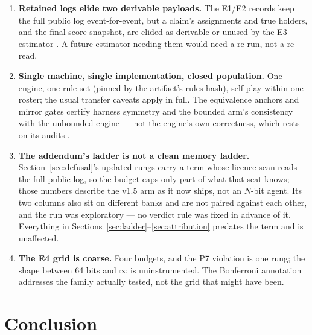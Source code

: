 \documentclass[11pt]{article}
\begin{document}
\begin{enumerate}
  the composition effect of Section~\ref{sec:evidence} shows how strongly availability
  selects on game character --- hence the seed-clustered estimator for every verdict,
  with pooled rates printed beside it. Half-lives require 200-observation bands, so
  their absence at 48$+$ bits partly reflects old-evidence availability thinning
  (strong players consume certain asks young), not only flatness.
\item \textbf{Retained logs elide two derivable payloads.} The E1/E2 records keep the
  full public log event-for-event, but a claim's assignments and true holders, and the
  final score snapshot, are elided as derivable or unused by the E3 estimator
  \cite{artifact}. A future estimator needing them would need a re-run, not a re-read.
\item \textbf{Single machine, single implementation, closed population.} One engine,
  one rule set (pinned by the artifact's rules hash), self-play within one roster; the
  usual transfer caveats \cite{v10paper} apply in full. The equivalence anchors and
  mirror gates certify harness symmetry and the bounded arm's consistency with the
  unbounded engine --- not the engine's own correctness, which rests on its audits
  \cite{v05paper,repo}.
\item \textbf{The addendum's ladder is not a clean memory ladder.}
  Section~\ref{sec:defusal}'s updated rungs carry a term whose licence scan reads the full
  public log, so the budget caps only part of what that seat knows; those numbers describe the
  v1.5 arm as it now ships, not an $N$-bit agent. Its two columns also sit on different banks and
  are not paired against each other, and the run was exploratory --- no verdict rule was fixed in
  advance of it. Everything in Sections~\ref{sec:ladder}--\ref{sec:attribution} predates the
  term and is unaffected.
\item \textbf{The E4 grid is coarse.} Four budgets, and the P7 violation is one rung;
  the shape between 64 bits and $\infty$ is uninstrumented. The Bonferroni annotation
  addresses the family actually tested, not the grid that might have been.
\end{enumerate}

\section{Conclusion}
\label{sec:conclusion}
\end{document}
